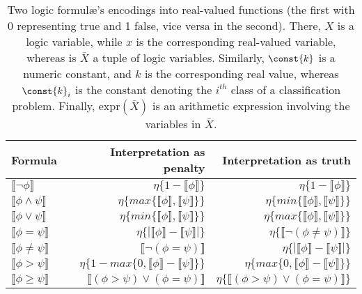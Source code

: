 
\begin{table}
    \centering
    \caption{
        Two logic formul\ae's encodings into real-valued functions (the first with 0 representing true and 1 false, vice versa in the second).
        There, $X$ is a logic variable, while $x$ is the corresponding real-valued variable, whereas is $\bar{X}$ a tuple of logic variables.
        Similarly, $\const{k}$ is a numeric constant, and $k$ is the corresponding real value, whereas $\const{k}_i$ is the constant denoting the $i^{th}$ class of a classification problem.
        Finally, $\text{expr}(\bar{X})$ is an arithmetic expression involving the variables in $\bar{X}$.
    }
    \label{tab:lukasiewicz-fuzzification}
    \begin{tabular}{l|r|r}
        \textbf{Formula} & \textbf{Interpretation as penalty} & \textbf{Interpretation as truth}
        \\
        \hline\hline
        $\llbracket\neg \phi\rrbracket$ & $\eta\{1 - \llbracket\phi\rrbracket\}$ & $\eta\{1 - \llbracket\phi\rrbracket\}$
        \\
        $\llbracket\phi  \wedge \psi\rrbracket$ &  $\eta\{max\{\llbracket\phi\rrbracket, \llbracket\psi\rrbracket\}\}$ &  $\eta\{min\{\llbracket\phi\rrbracket, \llbracket\psi\rrbracket\}\}$
        \\
        $\llbracket\phi  \vee \psi\rrbracket$ & $\eta\{min\{\llbracket\phi\rrbracket, \llbracket\psi\rrbracket\}\}$ & $\eta\{max\{\llbracket\phi\rrbracket, \llbracket\psi\rrbracket\}\}$
        \\
        $\llbracket\phi = \psi\rrbracket$ & $\eta\{|\llbracket\phi\rrbracket-\llbracket\psi\rrbracket|\}$ & $\eta\{\llbracket\neg( \phi \ne \psi )\rrbracket \}$
        \\
        $\llbracket\phi \ne \psi\rrbracket$ & $\llbracket \neg ( \phi = \psi )\rrbracket$ & $\eta\{|\llbracket\phi\rrbracket-\llbracket\psi\rrbracket|\}$ 
        \\
        $\llbracket\phi > \psi\rrbracket$  & $\eta\{1 - max\{0, \llbracket\phi\rrbracket - \llbracket\psi\rrbracket\}\} $ & $\eta\{max\{0, \llbracket\phi\rrbracket - \llbracket\psi\rrbracket\}\}$
        \\
        $\llbracket\phi \ge \psi\rrbracket$ & $ \llbracket(\phi > \psi) \vee (\phi = \psi)\rrbracket$ & $\eta\{\llbracket( \phi > \psi ) \vee ( \phi = \psi )\rrbracket\}$ 
        \\

\end{tabular}
\end{table}
